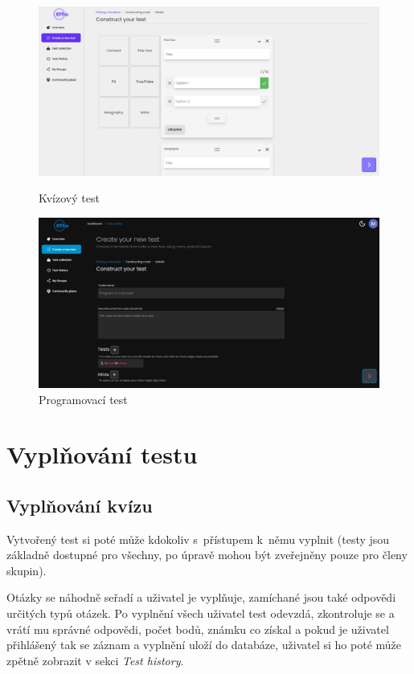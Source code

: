 \documentclass[12pt, a4paper,
openright
]{report}
\begin{document}
\begin{figure}[h]
	\centering
	\begin{minipage}[]{0.49\textwidth}
		\includegraphics[width=\textwidth]{image/test-creator1.png}
		\caption{Kvízový test}
		\label{fig:test-creator1}
	\end{minipage}
	\hfill
	\begin{minipage}[]{0.49\textwidth}
		\includegraphics[width=\textwidth]{image/test-creator2.png}
		\caption{Programovací test}
		\label{fig:test-creator2}
	\end{minipage}
\end{figure}

\section{Vyplňování testu}
\label{sec:test-take}
\subsection{Vyplňování kvízu}
Vytvořený test si poté může kdokoliv s~přístupem k~němu vyplnit (testy jsou základně dostupné pro všechny, po úpravě mohou být zveřejněny pouze pro členy skupin).

Otázky se náhodně seřadí a uživatel je vyplňuje, zamíchané jsou také odpovědi určitých typů otázek. Po vyplnění všech uživatel test odevzdá, zkontroluje se a vrátí mu správné odpovědi, počet bodů, známku co získal a pokud je uživatel přihlášený tak se záznam a vyplnění uloží do databáze, uživatel si ho poté může zpětně zobrazit v sekci \textit{Test history}.
\end{document}
